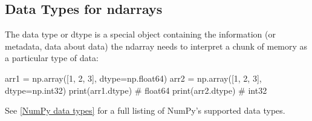 \subsection{Data Types for ndarrays\label{Data Types for ndarrays}}
The data type or dtype is a special object containing the information (or metadata, data about data) the ndarray needs to interpret a chunk of memory as a particular type of data:
\begin{pyc}
arr1 = np.array([1, 2, 3], dtype=np.float64)
arr2 = np.array([1, 2, 3], dtype=np.int32)
print(arr1.dtype) # float64
print(arr2.dtype) # int32
\end{pyc}
See \autoref{NumPy data types} for a full listing of NumPy's supported data types.
